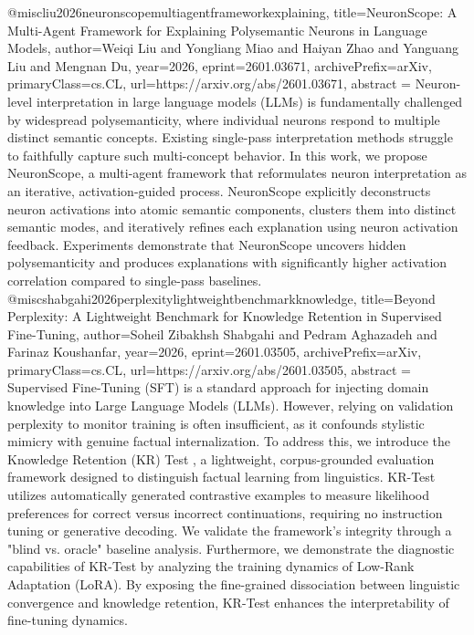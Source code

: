 {}@misc{liu2026neuronscopemultiagentframeworkexplaining,
      title={NeuronScope: A Multi-Agent Framework for Explaining Polysemantic Neurons in Language Models}, 
      author={Weiqi Liu and Yongliang Miao and Haiyan Zhao and Yanguang Liu and Mengnan Du},
      year={2026},
      eprint={2601.03671},
      archivePrefix={arXiv},
      primaryClass={cs.CL},
      url={https://arxiv.org/abs/2601.03671},
      abstract = {Neuron-level interpretation in large language models (LLMs) is fundamentally challenged by widespread polysemanticity, where individual neurons respond to multiple distinct semantic concepts. Existing single-pass interpretation methods struggle to faithfully capture such multi-concept behavior. In this work, we propose NeuronScope, a multi-agent framework that reformulates neuron interpretation as an iterative, activation-guided process. NeuronScope explicitly deconstructs neuron activations into atomic semantic components, clusters them into distinct semantic modes, and iteratively refines each explanation using neuron activation feedback. Experiments demonstrate that NeuronScope uncovers hidden polysemanticity and produces explanations with significantly higher activation correlation compared to single-pass baselines.}
}@misc{shabgahi2026perplexitylightweightbenchmarkknowledge,
      title={Beyond Perplexity: A Lightweight Benchmark for Knowledge Retention in Supervised Fine-Tuning}, 
      author={Soheil Zibakhsh Shabgahi and Pedram Aghazadeh and Farinaz Koushanfar},
      year={2026},
      eprint={2601.03505},
      archivePrefix={arXiv},
      primaryClass={cs.CL},
      url={https://arxiv.org/abs/2601.03505},
      abstract = {Supervised Fine-Tuning (SFT) is a standard approach for injecting domain knowledge into Large Language Models (LLMs). However, relying on validation perplexity to monitor training is often insufficient, as it confounds stylistic mimicry with genuine factual internalization. To address this, we introduce the Knowledge Retention (KR) Test , a lightweight, corpus-grounded evaluation framework designed to distinguish factual learning from linguistics. KR-Test utilizes automatically generated contrastive examples to measure likelihood preferences for correct versus incorrect continuations, requiring no instruction tuning or generative decoding. We validate the framework's integrity through a "blind vs. oracle" baseline analysis. Furthermore, we demonstrate the diagnostic capabilities of KR-Test by analyzing the training dynamics of Low-Rank Adaptation (LoRA). By exposing the fine-grained dissociation between linguistic convergence and knowledge retention, KR-Test enhances the interpretability of fine-tuning dynamics.}
}
